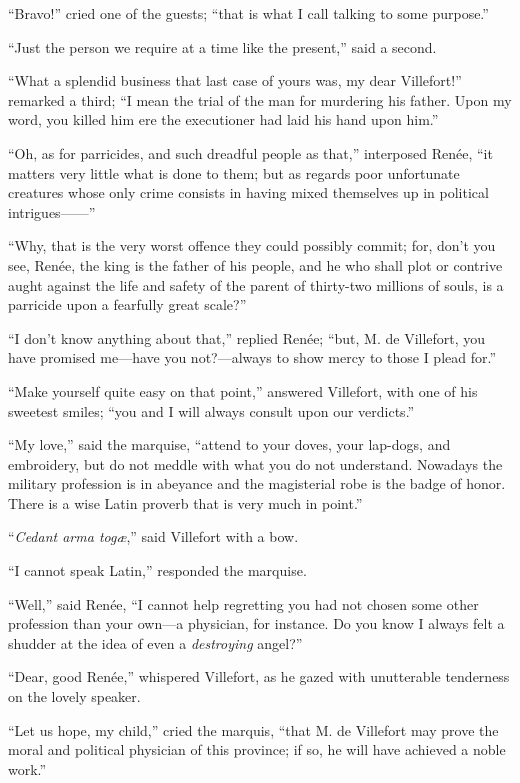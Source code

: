 “Bravo!” cried one of the guests; “that is what I call talking to some
purpose.”

“Just the person we require at a time like the present,” said a second.

“What a splendid business that last case of yours was, my dear
Villefort!” remarked a third; “I mean the trial of the man for
murdering his father. Upon my word, you killed him ere the executioner
had laid his hand upon him.”

“Oh, as for parricides, and such dreadful people as that,” interposed
Renée, “it matters very little what is done to them; but as regards
poor unfortunate creatures whose only crime consists in having mixed
themselves up in political intrigues——”

“Why, that is the very worst offence they could possibly commit; for,
don’t you see, Renée, the king is the father of his people, and he who
shall plot or contrive aught against the life and safety of the parent
of thirty-two millions of souls, is a parricide upon a fearfully great
scale?”

“I don’t know anything about that,” replied Renée; “but, M. de
Villefort, you have promised me—have you not?—always to show mercy to
those I plead for.”

“Make yourself quite easy on that point,” answered Villefort, with one
of his sweetest smiles; “you and I will always consult upon our
verdicts.”

“My love,” said the marquise, “attend to your doves, your lap-dogs, and
embroidery, but do not meddle with what you do not understand. Nowadays
the military profession is in abeyance and the magisterial robe is the
badge of honor. There is a wise Latin proverb that is very much in
point.”

“\textit{Cedant arma togæ},” said Villefort with a bow.

“I cannot speak Latin,” responded the marquise.

“Well,” said Renée, “I cannot help regretting you had not chosen some
other profession than your own—a physician, for instance. Do you know I
always felt a shudder at the idea of even a \textit{destroying} angel?”

“Dear, good Renée,” whispered Villefort, as he gazed with unutterable
tenderness on the lovely speaker.

“Let us hope, my child,” cried the marquis, “that M. de Villefort may
prove the moral and political physician of this province; if so, he
will have achieved a noble work.”

